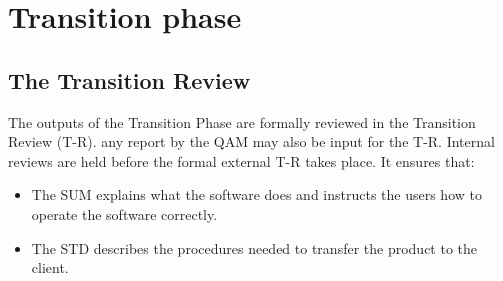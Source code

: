 \chapter{Transition phase} \label{chap:transitionPhase}
\section{The Transition Review}

The outputs of the Transition Phase are formally reviewed in the Transition Review (T-R). any report by the QAM may also be input for the T-R. Internal reviews are held  before the formal external T-R takes place. It ensures that:
\begin{itemize}
\item The SUM explains what the software does and instructs the users how to operate the software correctly.
\item The STD describes the procedures needed to transfer the product to the client.
\end{itemize}